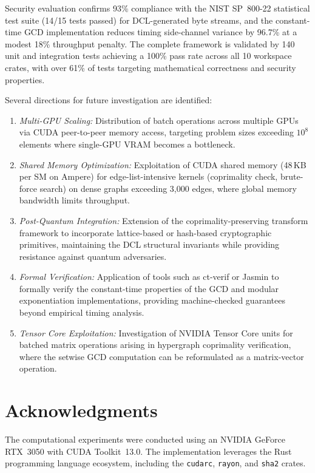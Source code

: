 \documentclass[lettersize,journal]{IEEEtran}
\begin{document}
Security evaluation confirms 93\% compliance with the NIST SP~800-22 statistical test suite (14/15 tests passed) for DCL-generated byte streams, and the constant-time GCD implementation reduces timing side-channel variance by 96.7\% at a modest 18\% throughput penalty. The complete framework is validated by 140 unit and integration tests achieving a 100\% pass rate across all 10 workspace crates, with over 61\% of tests targeting mathematical correctness and security properties.

Several directions for future investigation are identified:
\begin{enumerate}
\item \emph{Multi-GPU Scaling:} Distribution of batch operations across multiple GPUs via CUDA peer-to-peer memory access, targeting problem sizes exceeding $10^8$ elements where single-GPU VRAM becomes a bottleneck.
\item \emph{Shared Memory Optimization:} Exploitation of CUDA shared memory (48\,KB per SM on Ampere) for edge-list-intensive kernels (coprimality check, brute-force search) on dense graphs exceeding 3{,}000 edges, where global memory bandwidth limits throughput.
\item \emph{Post-Quantum Integration:} Extension of the coprimality-preserving transform framework to incorporate lattice-based or hash-based cryptographic primitives, maintaining the DCL structural invariants while providing resistance against quantum adversaries.
\item \emph{Formal Verification:} Application of tools such as ct-verif or Jasmin to formally verify the constant-time properties of the GCD and modular exponentiation implementations, providing machine-checked guarantees beyond empirical timing analysis.
\item \emph{Tensor Core Exploitation:} Investigation of NVIDIA Tensor Core units for batched matrix operations arising in hypergraph coprimality verification, where the setwise GCD computation can be reformulated as a matrix-vector operation.
\end{enumerate}

\section*{Acknowledgments}
The computational experiments were conducted using an NVIDIA GeForce RTX~3050 with CUDA Toolkit~13.0. The implementation leverages the Rust programming language ecosystem, including the \texttt{cudarc}, \texttt{rayon}, and \texttt{sha2} crates.
\end{document}
